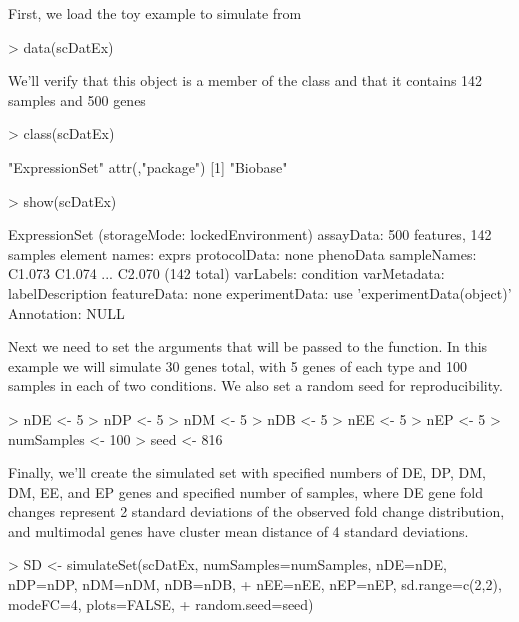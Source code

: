 \documentclass{article}
\begin{document}
First, we load the toy example  to simulate from
\begin{Schunk}
\begin{Sinput}
> data(scDatEx)
\end{Sinput}
\end{Schunk}

We'll verify that this object is a member of the  class and that it contains 142 samples and 500 genes
\begin{Schunk}
\begin{Sinput}
> class(scDatEx)
\end{Sinput}
\begin{Soutput}
[1] "ExpressionSet"
attr(,"package")
[1] "Biobase"
\end{Soutput}
\begin{Sinput}
> show(scDatEx)
\end{Sinput}
\begin{Soutput}
ExpressionSet (storageMode: lockedEnvironment)
assayData: 500 features, 142 samples 
  element names: exprs 
protocolData: none
phenoData
  sampleNames: C1.073 C1.074 ... C2.070 (142 total)
  varLabels: condition
  varMetadata: labelDescription
featureData: none
experimentData: use 'experimentData(object)'
Annotation:  
NULL
\end{Soutput}
\end{Schunk}

Next we need to set the arguments that will be passed to the  function.  In this example we will simulate 30 genes total, with 5 genes of each type and 100 samples in each of two conditions.  We also set a random seed for reproducibility.

\begin{Schunk}
\begin{Sinput}
> nDE <- 5
> nDP <- 5
> nDM <- 5
> nDB <- 5
> nEE <- 5
> nEP <- 5
> numSamples <- 100
> seed <- 816
\end{Sinput}
\end{Schunk}

Finally, we'll create the simulated set with specified numbers of DE, DP, DM, DM, EE, and EP genes and specified number of samples, where DE gene fold changes represent 2 standard deviations of the observed fold change distribution, and multimodal genes have cluster mean distance of 4 standard deviations.
\begin{Schunk}
\begin{Sinput}
> SD <- simulateSet(scDatEx, numSamples=numSamples, nDE=nDE, nDP=nDP, nDM=nDM, nDB=nDB, 
+                   nEE=nEE, nEP=nEP, sd.range=c(2,2), modeFC=4, plots=FALSE, 
+                   random.seed=seed)
\end{Sinput}
\end{Schunk}
\end{document}
